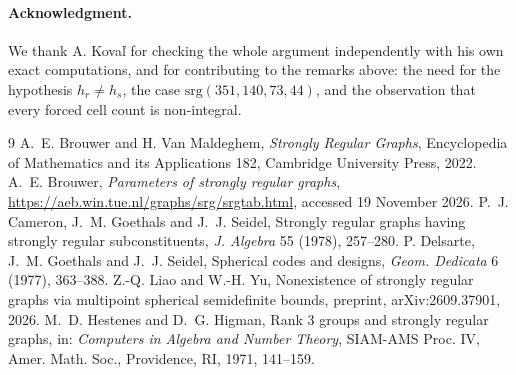 \documentclass[11pt]{article}
\begin{document}
\paragraph{Acknowledgment.} We thank A. Kova\v{l} for checking the whole argument independently with his own exact
computations, and for contributing to the remarks above: the need for the hypothesis $h_r\ne h_s$, the case
$\mathrm{srg}(351,140,73,44)$, and the observation that every forced cell count is non-integral.

\begin{thebibliography}{9}\small
{} A.~E. Brouwer and H. Van Maldeghem, \emph{Strongly Regular Graphs}, Encyclopedia of Mathematics and
its Applications 182, Cambridge University Press, 2022.
 A.~E. Brouwer, \emph{Parameters of strongly regular graphs},
\url{https://aeb.win.tue.nl/graphs/srg/srgtab.html}, accessed 19 November 2026.
 P.~J. Cameron, J.~M. Goethals and J.~J. Seidel, Strongly regular graphs having strongly regular
subconstituents, \emph{J. Algebra} 55 (1978), 257--280.
 P. Delsarte, J.~M. Goethals and J.~J. Seidel, Spherical codes and designs, \emph{Geom. Dedicata} 6
(1977), 363--388.
 Z.-Q. Liao and W.-H. Yu, Nonexistence of strongly regular graphs via multipoint spherical
semidefinite bounds, preprint, arXiv:2609.37901, 2026.
 M.~D. Hestenes and D.~G. Higman, Rank 3 groups and strongly regular graphs, in: \emph{Computers in
Algebra and Number Theory}, SIAM-AMS Proc. IV, Amer. Math. Soc., Providence, RI, 1971, 141--159.
\end{thebibliography}
\end{document}
